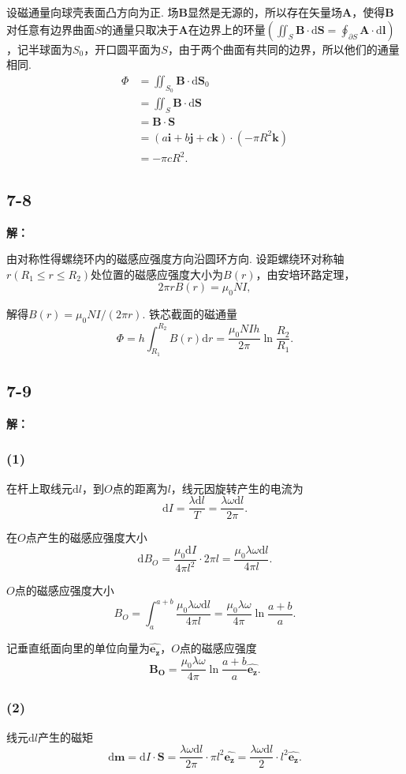 \documentclass[twocolumn]{ctexart}
\newcommand{\sol}[1]{\subsection*{#1}\noindent\textbf{解：}
	
}
\begin{document}
	设磁通量向球壳表面凸方向为正. 场$\mathbf B$显然是无源的，所以存在矢量场$\mathbf A$，使得$\mathbf B$对任意有边界曲面$S$的通量只取决于$\mathbf A$在边界上的环量$\left(\iint_{S}\mathbf B\cdot\mathrm d\mathbf S=\oint_{\partial S}\mathbf A\cdot\mathrm d\mathbf l\right)$，记半球面为$S_0$，开口圆平面为$S$，由于两个曲面有共同的边界，所以他们的通量相同.
	\begin{align*}
		\Phi&=\iint_{S_0}\mathbf B\cdot\mathrm d\mathbf S_0\\
		&=\iint_{S}\mathbf B\cdot\mathrm d\mathbf S\\
		&=\mathbf B\cdot\mathbf S\\
		&=\left(a\mathbf i+b\mathbf j+c\mathbf k\right)\cdot\left(-\pi R^2\mathbf k\right)\\
		&=-\pi cR^2.
	\end{align*}
	\sol{7-8}
	由对称性得螺绕环内的磁感应强度方向沿圆环方向. 设距螺绕环对称轴$r\left(R_1\leq r\leq R_2\right)$处位置的磁感应强度大小为$B(r)$，由安培环路定理，
	$$2\pi rB(r)=\mu_0NI,$$
	
	解得$B(r)=\mu_0NI/\left(2\pi r\right)$. 铁芯截面的磁通量
	$$\Phi=h\int_{R_1}^{R_2}B(r)\mathrm dr=\frac{\mu_0NIh}{2\pi}\ln\frac{R_2}{R_1}.$$
	\sol{7-9}
	\subsubsection*{(1)}
	
	在杆上取线元$\mathrm dl$，到$O$点的距离为$l$，线元因旋转产生的电流为
	$$\mathrm dI=\frac{\lambda\mathrm dl}{T}=\frac{\lambda\omega\mathrm dl}{2\pi}.$$
	
	在$O$点产生的磁感应强度大小
	$$\mathrm dB_O=\frac{\mu_0\mathrm dI}{4\pi l^2}\cdot2\pi l=\frac{\mu_0\lambda\omega\mathrm dl}{4\pi l}.$$
	
	$O$点的磁感应强度大小
	$$B_O=\int_{a}^{a+b}\frac{\mu_0\lambda\omega\mathrm dl}{4\pi l}=\frac{\mu_0\lambda\omega }{4\pi}\ln\frac{a+b}{a}.$$
	
	记垂直纸面向里的单位向量为$\hat{\mathbf{e_z}}$，$O$点的磁感应强度
	$$\mathbf{B_O}=\frac{\mu_0\lambda\omega }{4\pi}\ln\frac{a+b}{a}\hat{\mathbf{e_z}}.$$
	
	\subsubsection*{(2)}
	线元$\mathrm dl$产生的磁矩
	$$\mathrm d\mathbf m=\mathrm dI\cdot\mathbf S=\frac{\lambda\omega\mathrm dl}{2\pi}\cdot\pi l^2\hat{\mathbf{e_z}}=\frac{\lambda\omega\mathrm dl}{2}\cdot l^2\hat{\mathbf{e_z}}.$$
	
\end{document}
